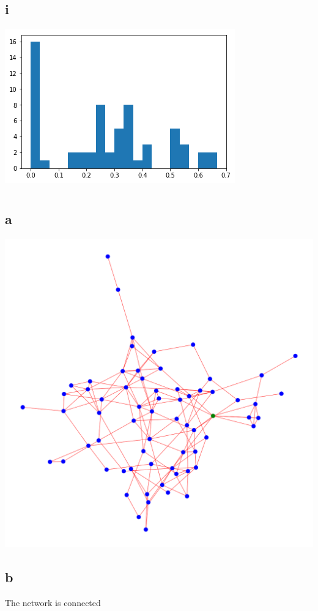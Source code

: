 \documentclass[12pt]{article}
\begin{document}
\subsection*{i}\includegraphics[scale = 0.7]{15.png}
\pagebreak


\section{}
\subsection*{a}
\includegraphics[width=\textwidth]{21.png}
\pagebreak
\subsection*{b} The network is connected
\end{document}
